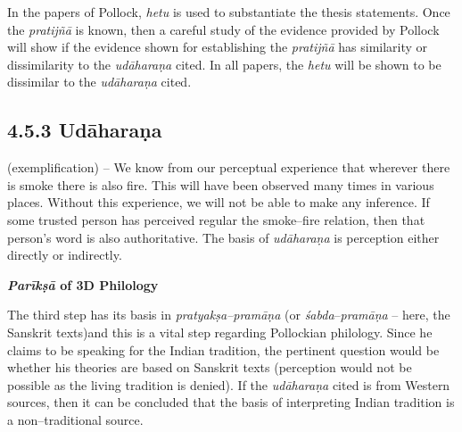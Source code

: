 In the papers of Pollock, \textit{hetu} is used to substantiate the thesis statements. Once the \textit{pratijñā} is known, then a careful study of the evidence provided by Pollock will show if the evidence shown for establishing the \textit{pratijñā} has similarity or dissimilarity to the \textit{udāharaṇa} cited. In all papers, the \textit{hetu} will be shown to be dissimilar to the \textit{udāharaṇa }cited.


\subsection*{4.5.3 Udāharaṇa}

(exemplification) – We know from our perceptual experience that wherever there is smoke there is also fire. This will have been observed many times in various places. Without this experience, we will not be able to make any inference. If some trusted person has perceived regular the smoke–fire relation, then that person’s word is also authoritative. The basis of \textit{udāharaṇa }is perception either directly or indirectly.

\textbf{\textit{Parīkṣā} of 3D Philology}

The third step has its basis in \textit{pratyakṣa–pramāṇa} (or \textit{śabda}–\textit{pramāṇa} – here, the Sanskrit texts)and this is a vital step regarding Pollockian philology. Since he claims to be speaking for the Indian tradition, the pertinent question would be whether his theories are based on Sanskrit texts (perception would not be possible as the living tradition is denied). If the\textit{ udāharaṇa }cited is from Western sources, then it can be concluded that the basis of interpreting Indian tradition is a non–traditional source.


